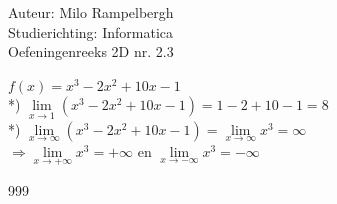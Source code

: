 \documentclass[a4paper]{article}
\newcommand{\llim}{\lim\limits}
\newcommand{\fx}{x^3 - 2x^2 + 10x - 1}
\begin{document}
\noindent \large Auteur: Milo Rampelbergh \\
\noindent \large Studierichting: Informatica\\
\noindent \large Oefeningenreeks 2D nr. 2.3\\

\medskip

\normalsize


$ f(x) = \fx $ \\

*) $ \llim_{x \rightarrow 1} (\fx) = 1-2+10-1 = 8 $ \\

*)  $  \llim_{x \rightarrow \infty} (\fx)  = \llim_{x \rightarrow \infty} x^3 = \infty  $\\

$ \Rightarrow \llim_{x \rightarrow +\infty} x^3 = +\infty$ en $ \llim_{x \rightarrow -\infty} x^3 = -\infty $\\



\begin{thebibliography}{999}
\end{thebibliography}
\end{document}
